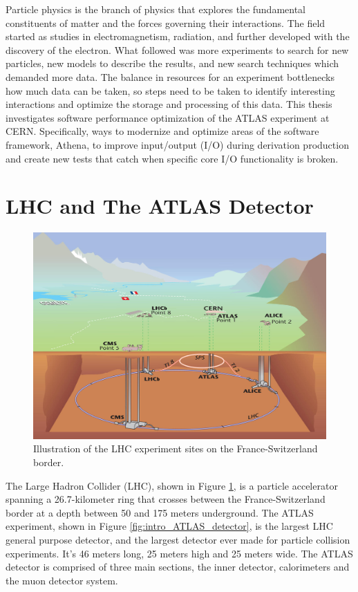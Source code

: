Particle physics is the branch of physics that explores the fundamental constituents of matter and the forces governing their interactions.  
The field started as studies in electromagnetism, radiation, and further developed with the discovery of the electron.
What followed was more experiments to search for new particles, new models to describe the results, and new search techniques which demanded more data.
The balance in resources for an experiment bottlenecks how much data can be taken, so steps need to be taken to identify interesting interactions and optimize the storage and processing of this data.
This thesis investigates software performance optimization of the ATLAS experiment at CERN. 
Specifically, ways to modernize and optimize areas of the software framework, Athena, to improve input/output (I/O) during derivation production and create new tests that catch when specific core I/O functionality is broken.

\section{LHC and The ATLAS Detector}

\begin{figure}[h]
    \centering
    \includegraphics[width=.8\textwidth]{content/img/LHC illustration.jpg}
    \caption{Illustration of the LHC experiment sites on the France-Switzerland border. \cite{LHC_Illustration}}
    \label{fig:intro_LHC_sites}
\end{figure}

The Large Hadron Collider (LHC), shown in Figure \ref{fig:intro_LHC_sites},  is a particle accelerator spanning a 26.7-kilometer ring that crosses between the France-Switzerland border at a depth between 50 and 175 meters underground.\cite{LHC_faq_guide}
The ATLAS experiment, shown in Figure \ref{fig:intro_ATLAS_detector}, is the largest LHC general purpose detector, and the largest detector ever made for particle collision experiments. 
It's 46 meters long, 25 meters high and 25 meters wide.\cite{ATLAS_Fact_Sheet}
The ATLAS detector is comprised of three main sections, the inner detector, calorimeters and the muon detector system. 



